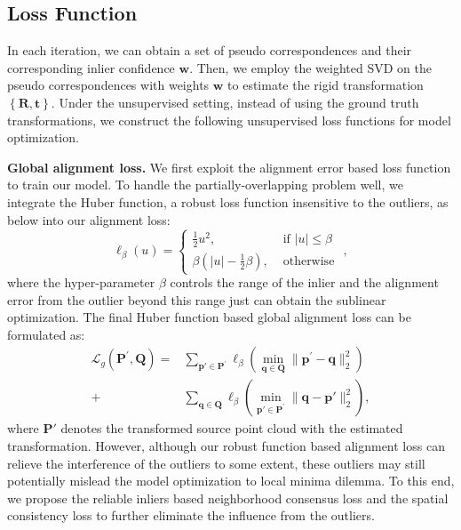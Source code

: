 \documentclass[letterpaper]{article} %
\begin{document}
	\subsection{Loss Function}\label{loss1}
	In each iteration, we can obtain a set of pseudo correspondences and their corresponding inlier confidence $\mathbf{w}$. Then, we employ the weighted SVD on the pseudo correspondences with weights $\mathbf{w}$ to estimate the rigid transformation $\left\{\mathbf{R},\mathbf{t}\right\}$. Under the unsupervised setting, instead of using the ground truth transformations, we construct the following unsupervised loss functions for model optimization.

	\noindent \textbf{Global alignment loss.}
	We first exploit the alignment error based loss function to train our model. To handle the partially-overlapping problem well, we integrate the Huber function, a robust loss function insensitive to the outliers, as below into our alignment loss:
	\begin{equation}\label{huber}
	\ell_{\beta}(u)= \begin{cases}\frac{1}{2} u^{2}, & \text { if }|u| \leq \beta \\ \beta\left(|u|-\frac{1}{2} \beta\right), & \text { otherwise }\end{cases},
	\end{equation}
	where the hyper-parameter $\beta$ controls the range of the inlier and the alignment error from the outlier beyond this range just can obtain the sublinear optimization.
	The final Huber function based global alignment loss can be formulated as:
	\begin{equation}
	\begin{split}
	\mathcal{L}_g\left(\mathbf{P}^{\prime}, \mathbf{Q}\right) =&\sum_{\mathbf{p}' \in \mathbf{P}^{\prime}} \ell_{\beta}\left(\min _{\mathbf{q} \in \mathbf{Q}}\|\mathbf{p}^{\prime}-\mathbf{q}\|_{2}^{2}\right) \\
	+&\sum_{\mathbf{q} \in \mathbf{Q}} \ell_{\beta}\left(\min _{\mathbf{p}' \in \mathbf{P}^{\prime}}\|\mathbf{q}-\mathbf{p}'\|_{2}^{2}\right),
	\end{split}
	\end{equation}
	where $\mathbf{P}'$ denotes the transformed source point cloud with the estimated transformation.
	However, although our robust function based alignment loss can relieve the interference of the outliers to some extent, these outliers may still potentially mislead the model optimization to local minima dilemma. To this end, we propose the reliable inliers based neighborhood consensus loss and the spatial consistency loss to further eliminate the influence from the outliers.
\end{document}
